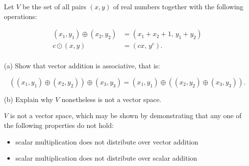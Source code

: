 
\begin{exerciseStatement}


 Let \(V\) be the set of all pairs \((x,y)\) of real numbers together with the following operations: 


\begin{align*} (x_1,y_1)\oplus (x_2,y_2)&= \left(x_{1} + x_{2} + 1,\,y_{1} + y_{2}\right)  \\c \odot (x,y) &= \left(c x,\,y^{c}\right) . \\ \end{align*}
            

 (a) Show that vector addition is associative, that is: 

\[\left((x_1,y_1)\oplus(x_2,y_2)\right)\oplus(x_3,y_3)=(x_1,y_1)\oplus\left((x_2,y_2)\oplus(x_3,y_3)\right).
    \]

 (b) Explain why \(V\) nonetheless is not a vector space. 


\end{exerciseStatement}
    
\begin{exerciseAnswer} 


\(V\) is not a vector space, which may be shown by demonstrating that any one of the following properties do not hold: 


\begin{itemize}
\item scalar multiplication does not distribute over vector addition
\item scalar multiplication does not distribute over scalar addition
\end{itemize}
    
\end{exerciseAnswer}
    
